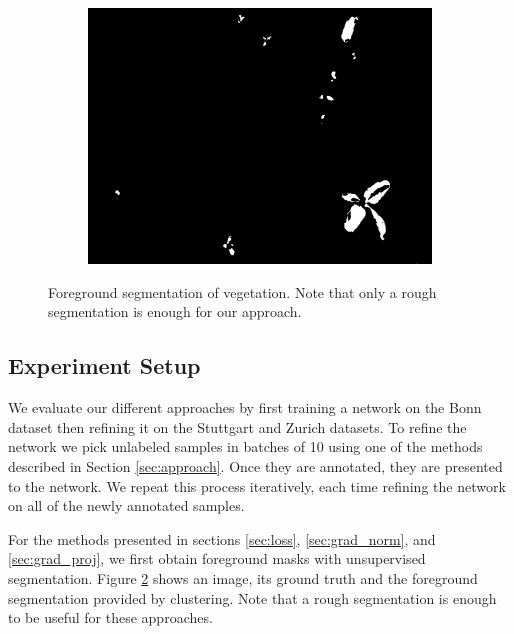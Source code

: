 \documentclass[letterpaper, 10 pt, conference]{ieeeconf}  %
\begin{document}
\begin{figure}
\begin{subfigure}[b]{0.49\linewidth}
   \end{subfigure}
      \begin{subfigure}[b]{0.49\linewidth}
    \includegraphics[width=\linewidth]{pics/unsupervised/lbl_masks_8mm_fromImages_frame256.png}
   		\caption{}
		\label{unsup_lbl}    		
    \vspace{1em}
   \end{subfigure}
    \caption{Foreground segmentation of vegetation. Note that only a rough segmentation is enough for our approach.}
    \label{fig:unsupervised_foreground}
\end{figure}


\subsection{Experiment Setup}

We evaluate our different approaches by first training a network on the Bonn dataset then refining it on the Stuttgart and Zurich datasets. To refine the network we pick unlabeled samples in batches of 10 using one of the methods described in Section \ref{sec:approach}. Once they are annotated, they are presented to the network. We repeat this process iteratively, each time refining the network on all of the newly annotated samples. 

For the methods presented in sections \ref{sec:loss}, \ref{sec:grad_norm}, and \ref{sec:grad_proj}, we first obtain foreground masks with unsupervised segmentation. Figure  \ref{fig:unsupervised_foreground} shows an image, its ground truth and the foreground segmentation provided by clustering. Note that a rough segmentation is enough to be useful for these approaches.
\end{document}
